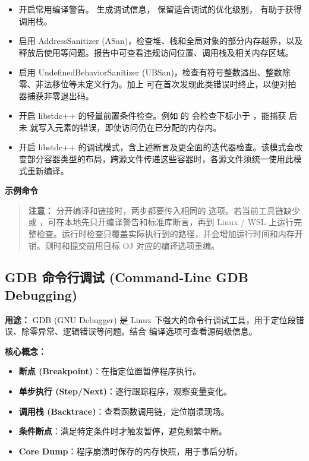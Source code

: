 \begin{itemize}
  \item {} 开启常用编译警告。 生成调试信息， 保留适合调试的优化级别， 有助于获得调用栈。
  \item {} 启用 AddressSanitizer (ASan)，检查堆、栈和全局对象的部分内存越界，以及释放后使用等问题。报告中可查看违规访问位置、调用栈及相关内存区域。
  \item {} 启用 UndefinedBehaviorSanitizer (UBSan)，检查有符号整数溢出、整数除零、非法移位等未定义行为。加上  可在首次发现此类错误时终止，以便对拍器捕获非零退出码。
  \item {} 开启 libstdc++ 的轻量前置条件检查。例如  的  会检查下标小于 ，能捕获  后未  就写入元素的错误，即使访问仍在已分配的内存内。
  \item {} 开启 libstdc++ 的调试模式，含上述断言及更全面的迭代器检查。该模式会改变部分容器类型的布局，跨源文件传递这些容器时，各源文件须统一使用此模式重新编译。
\end{itemize}

\textbf{示例命令}


\begin{quote}
  \textbf{注意：} 分开编译和链接时，两步都要传入相同的  选项。若当前工具链缺少  或 ，可在本地先只开编译警告和标准库断言，再到 Linux / WSL 上运行完整检查。运行时检查只覆盖实际执行到的路径，并会增加运行时间和内存开销。测时和提交前用目标 OJ 对应的编译选项重编。
\end{quote}

\subsection{GDB 命令行调试 (Command-Line GDB Debugging)}

\textbf{用途：} GDB (GNU Debugger) 是 Linux 下强大的命令行调试工具，用于定位段错误、除零异常、逻辑错误等问题。结合  编译选项可查看源码级信息。

\textbf{核心概念：}
\begin{itemize}
  \item \textbf{断点 (Breakpoint)}：在指定位置暂停程序执行。
  \item \textbf{单步执行 (Step/Next)}：逐行跟踪程序，观察变量变化。
  \item \textbf{调用栈 (Backtrace)}：查看函数调用链，定位崩溃现场。
  \item \textbf{条件断点}：满足特定条件时才触发暂停，避免频繁中断。
  \item \textbf{Core Dump}：程序崩溃时保存的内存快照，用于事后分析。
\end{itemize}

